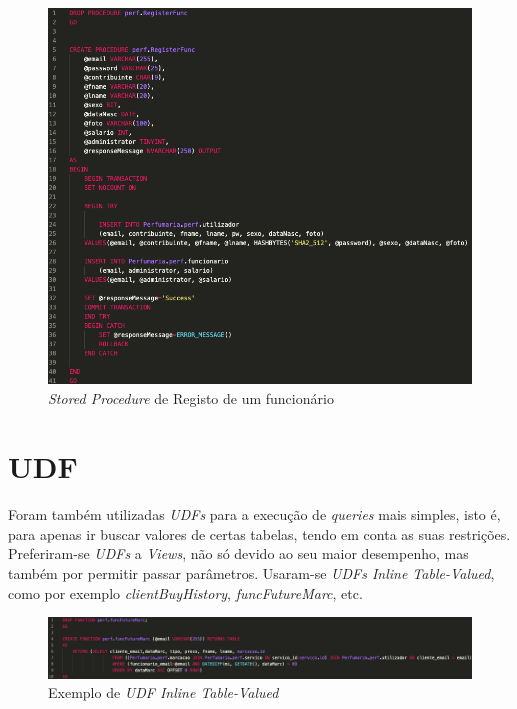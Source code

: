 \documentclass[10pt,portuguese]{article}
\begin{document}
\begin{figure}[!h]
    \centering
    \includegraphics[width=\textwidth]{images/registerFunc.png}
    \caption{\textit{Stored Procedure} de Registo de um funcionário}
\end{figure}


\clearpage

\section{UDF}

\par Foram também utilizadas \textit{UDFs} para a execução de \textit{queries} mais simples, isto é, para apenas ir buscar valores de certas tabelas, tendo em conta as suas restrições. Preferiram-se \textit{UDFs} a \textit{Views}, não só devido ao seu maior desempenho, mas também por permitir passar parâmetros. Usaram-se \textit{UDFs Inline Table-Valued}, como por exemplo \textit{clientBuyHistory}, \textit{funcFutureMarc}, etc.

\begin{figure}[!h]
    \centering
    \includegraphics[width=\textwidth]{images/funcFutureMarc.png}
    \caption{Exemplo de \textit{UDF Inline Table-Valued}}
\end{figure}
\end{document}
